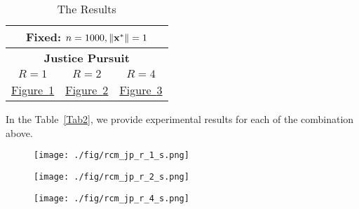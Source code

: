 \begin{center}
	\begin{table}
		\centering
		\begin{tabular}{ccc}\toprule
			\multicolumn{3}{c}{\small{\textbf{Fixed:} $n=1000,\|\mathbf{{x}^*}\|=1$}} \\ \midrule
			\multicolumn{3}{c}{\textbf{Justice Pursuit}}
			\\\cmidrule(r){1-3}%
			\small{$R =1$}&\small{$R=2$}&\small{$R=4$} \\\midrule
			\hyperref[fig:plot-2-1]{Figure~\ref{fig:plot-2-1}} & \hyperref[fig:plot-2-2]{Figure~\ref{fig:plot-2-2}}
			& \hyperref[fig:plot-2-3]{Figure~\ref{fig:plot-2-3}}   \\
			\bottomrule
		\end{tabular}
		\caption{The Results}\label{Tab3}
	\end{table} 	
\end{center}
In the Table~\ref{Tab2}, we provide experimental results for each of the combination above.

 
\begin{figure}[t]
	\begin{center}
		\texttt{[image: ./fig/rcm\_jp\_r\_1\_s.png]}
	\end{center}
	\caption{}
	\label{fig:plot-2-1}
\end{figure}


\begin{figure}[t]
	\begin{center}
		\texttt{[image: ./fig/rcm\_jp\_r\_2\_s.png]}
	\end{center}
	\caption{}
	\label{fig:plot-2-2}
\end{figure}


\begin{figure}[t]
	\begin{center}
		\texttt{[image: ./fig/rcm\_jp\_r\_4\_s.png]}
	\end{center}
	\caption{}
	\label{fig:plot-2-3}
\end{figure}